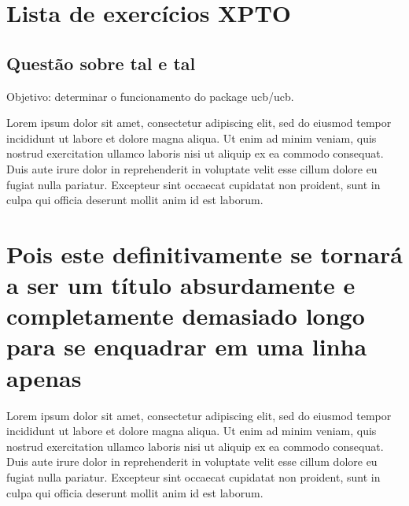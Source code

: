 \documentclass[12pt]{article}
\begin{document}


\sumario


\iniciotexto


\section{Lista de exercícios XPTO}

\subsection{Questão sobre tal e tal}

Objetivo: determinar o funcionamento do package ucb/ucb.


Lorem ipsum dolor sit amet, consectetur adipiscing elit, sed do eiusmod tempor incididunt ut labore et dolore magna aliqua. Ut enim ad minim veniam, quis nostrud exercitation ullamco laboris nisi ut aliquip ex ea commodo consequat. Duis aute irure dolor in reprehenderit in voluptate velit esse cillum dolore eu fugiat nulla pariatur. Excepteur sint occaecat cupidatat non proident, sunt in culpa qui officia deserunt mollit anim id est laborum.

\section[Título resumido]{Pois este definitivamente se tornará a ser um título absurdamente e completamente demasiado longo para se enquadrar em uma linha apenas}


Lorem ipsum dolor sit amet, consectetur adipiscing elit, sed do eiusmod tempor incididunt ut labore et dolore magna aliqua. Ut enim ad minim veniam, quis nostrud exercitation ullamco laboris nisi ut aliquip ex ea commodo consequat. Duis aute irure dolor in reprehenderit in voluptate velit esse cillum dolore eu fugiat nulla pariatur. Excepteur sint occaecat cupidatat non proident, sunt in culpa qui officia deserunt mollit anim id est laborum.
\newline
\end{document}

